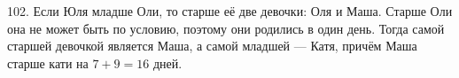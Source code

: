 102. Если Юля младше Оли, то старше её две девочки: Оля и Маша. Старше Оли она не может быть по условию, поэтому они родились в один день. Тогда самой старшей девочкой является Маша, а самой младшей --- Катя, причём Маша старше кати на $7+9=16$ дней.\\
